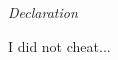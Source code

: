 \thispagestyle{plain}
\begin{center}
	\LARGE{\emph{Declaration}}
\end{center}
\vspace{1cm}
I did not cheat...